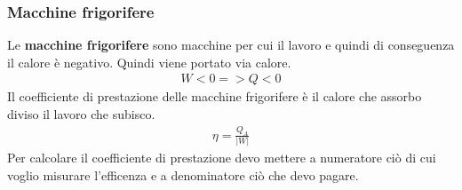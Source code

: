             \subsubsection{Macchine frigorifere}
                Le \textbf{macchine frigorifere} sono macchine per cui il lavoro e quindi di conseguenza il calore è negativo. Quindi viene portato via calore.
                \begin{align*}
                    W < 0 => Q < 0
                \end{align*}
                Il coefficiente di prestazione delle macchine frigorifere è il calore che assorbo diviso il lavoro che subisco.
                \begin{align*}
                    \eta = \frac{Q_A}{|W|}
                \end{align*}
                Per calcolare il coefficiente di prestazione devo mettere a numeratore ciò di cui voglio misurare l'efficenza e a denominatore ciò che devo pagare.


